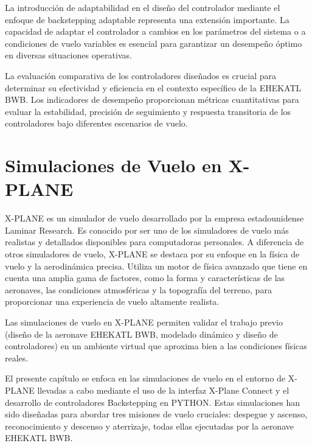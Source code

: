 La introducción de adaptabilidad en el diseño del controlador mediante el enfoque de backstepping adaptable representa una extensión importante. La capacidad de adaptar el controlador a cambios en los parámetros del sistema o a condiciones de vuelo variables es esencial para garantizar un desempeño óptimo en diversas situaciones operativas.

La evaluación comparativa de los controladores diseñados es crucial para determinar su efectividad y eficiencia en el contexto específico de la EHEKATL BWB. Los indicadores de desempeño proporcionan métricas cuantitativas para evaluar la estabilidad, precisión de seguimiento y respuesta transitoria de los controladores bajo diferentes escenarios de vuelo.


\chapter{Simulaciones de Vuelo en X-PLANE}

X-PLANE es un simulador de vuelo desarrollado por la empresa estadounidense Laminar Research. Es conocido por ser uno de los simuladores de vuelo más realistas y detallados disponibles para computadoras personales.
%
A diferencia de otros simuladores de vuelo, X-PLANE se destaca por su enfoque en la física de vuelo y la aerodinámica precisa. Utiliza un motor de física avanzado que tiene en cuenta una amplia gama de factores, como la forma y características de las aeronaves, las condiciones atmosféricas y la topografía del terreno, para proporcionar una experiencia de vuelo altamente realista.

Las simulaciones de vuelo en X-PLANE permiten validar el trabajo previo (diseño de la aeronave EHEKATL BWB, modelado dinámico y diseño de controladores) en un ambiente virtual que aproxima bien a las condiciones físicas reales. 

El presente capítulo se enfoca en las simulaciones de vuelo en el entorno de X-PLANE llevadas a cabo mediante el uso de la interfaz X-Plane Connect y el desarrollo de controladores Backstepping en PYTHON. Estas simulaciones han sido diseñadas para abordar tres misiones de vuelo cruciales: despegue y ascenso, reconocimiento y descenso y aterrizaje, todas ellas ejecutadas por la aeronave EHEKATL BWB.

\medskip

